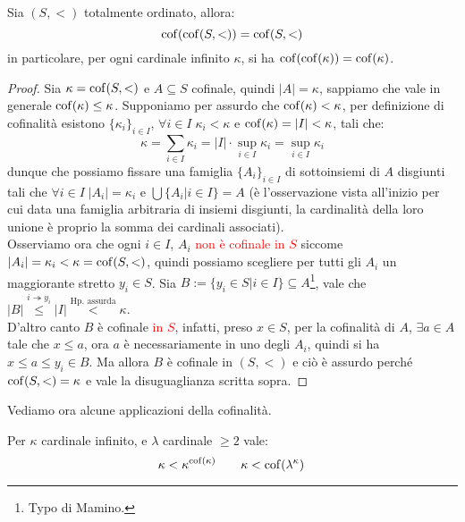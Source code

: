 \begin{remark}
	Sia $(S,<)$ totalmente ordinato, allora:
	\[ \operatorname{cof}(\operatorname{cof}(S,<)) = \operatorname{cof}(S,<)
		\]
	in particolare, per ogni cardinale infinito $\kappa$, si ha $\operatorname{cof}(\operatorname{cof}(\kappa)) = \operatorname{cof}(\kappa)$.
\end{remark}

\begin{proof}
	Sia $\kappa = \operatorname{cof}(S,<)$ e $A \subseteq S$ cofinale, quindi $|A| = \kappa$, sappiamo che vale in generale $\operatorname{cof}(\kappa) \leq \kappa$. Supponiamo per assurdo che $\operatorname{cof}(\kappa) < \kappa$,
	per definizione di cofinalità esistono $\{\kappa_i\}_{i \in I}$, $\forall i \in I \; \kappa_i < \kappa$ e $\operatorname{cof}(\kappa) = |I| < \kappa$, tali che:
	\[ \kappa = \sum_{i \in I} \kappa_i = |I| \cdot \sup_{i \in I}\kappa_i = \sup_{i \in I}\kappa_i
		\]
	dunque che possiamo fissare una famiglia $\{A_i\}_{i \in I}$ di sottoinsiemi di $A$ disgiunti tali che $\forall i \in I \; |A_i| = \kappa_i$ e $\bigcup\{A_i | i \in I\} = A$ (è l'osservazione vista all'inizio per cui data una famiglia arbitraria di insiemi disgiunti, la cardinalità della loro unione è proprio la somma dei cardinali associati).\\
	Osserviamo ora che ogni $i \in I$, $A_i$ \textcolor{red}{non è cofinale in $S$} siccome $|A_i| = \kappa_i < \kappa = \operatorname{cof}(S,<)$, quindi possiamo scegliere per tutti gli $A_i$ un maggiorante stretto $y_i \in S$.
	Sia $B := \{y_i \in S | i \in I\} \subseteq A$\footnote{Typo di Mamino.}, vale che $|B| \overset{i \twoheadrightarrow y_i}{\leq} |I| \overset{\text{Hp. assurda}}{<} \kappa$.\\
	D'altro canto $B$ è cofinale \textcolor{red}{in $S$}, infatti, preso $x \in S$, per la cofinalità di $A$,
	$\exists a \in A$ tale che $x \leq a$, ora $a$ è necessariamente in uno degli $A_i$, quindi si ha $x \leq a \leq y_i \in B$.
	Ma allora $B$ è cofinale in $(S,<)$ e ciò è assurdo perché $\operatorname{cof}(S,<) = \kappa$ e vale la disuguaglianza scritta sopra.
\end{proof}

Vediamo ora alcune applicazioni della cofinalità.

\begin{corollary}
	Per $\kappa$ cardinale infinito, e $\lambda$ cardinale $\geq 2$ vale:
	\[ \kappa < \kappa^{\operatorname{cof}(\kappa)} \qquad \kappa < \operatorname{cof}(\lambda^{\kappa})\,
		\]
\end{corollary}

